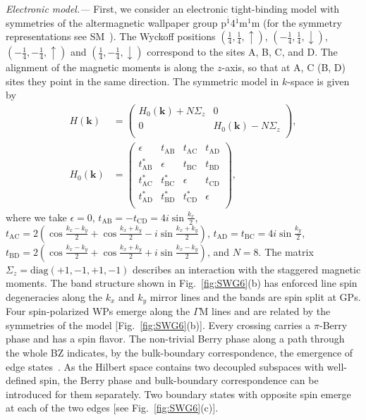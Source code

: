 \documentclass[aps,prb,twocolumn,amsmath,amssymb,floatfix]{revtex4-2}
\begin{document}
\textit{Electronic model.---}
First, we consider an electronic tight-binding model with symmetries of the altermagnetic wallpaper group p$^{\overline{1}}$4$^{\overline{1}}$m$^1$m (for the symmetry representations see SM~\cite{sm_note}). 
The Wyckoff positions $(\tfrac{1}{4},\tfrac{1}{4}, \uparrow)$, $(-\tfrac{1}{4},\tfrac{1}{4}, \downarrow)$, $(-\tfrac{1}{4},-\tfrac{1}{4}, \uparrow)$ and $(\tfrac{1}{4},-\tfrac{1}{4}, \downarrow)$ correspond to the sites A, B, C, and D. The alignment of the magnetic moments is along the $z$-axis, so that at A, C (B, D) sites they point in the same direction. The symmetric model in $k$-space is given by
\begin{subequations}\label{TBelectronicmodel_main}
\begin{align}
    H(\mathbf{k}) &= \begin{pmatrix}
        H_0(\mathbf{k}) + N \Sigma_z&0\\
        0 & H_0(\mathbf{k}) - N \Sigma_z\\
    \end{pmatrix},\\
    H_0(\mathbf{k}) &=  \begin{pmatrix}
        \epsilon&t_{\text{AB}}&t_{\text{AC}}&t_{\text{AD}}\\
        t_{\text{AB}}^* & \epsilon&t_{\text{BC}}&t_{\text{BD}}\\
        t_{\text{AC}}^* & t_{\text{BC}}^*&\epsilon&t_{\text{CD}}\\
        t_{\text{AD}}^* & t_{\text{BD}}^*&t_{\text{CD}}^*&\epsilon\\
    \end{pmatrix},
\end{align}
\end{subequations}
where we take $\epsilon =0$, $t_{\text{AB}}=-t_{\text{CD}}=4i\sin\tfrac{k_x}{2}$, $t_{\text{AC}}=2(\cos\tfrac{k_x-k_y}{2} + \cos\tfrac{k_x+k_y}{2} - i \sin\tfrac{k_x+k_y}{2})$, $t_{\text{AD}}=t_{\text{BC}}=4i \sin\tfrac{k_y}{2}$, $t_{\text{BD}}=2(\cos\tfrac{k_x-k_y}{2} + \cos\tfrac{k_x+k_y}{2} + i \sin\tfrac{k_x-k_y}{2})$, and $N = 8$. The matrix $\Sigma_z = \text{diag} (+1, -1, +1, -1)$ describes an interaction with the staggered magnetic moments.
The band structure shown in Fig.~\ref{fig:SWG6}(b) has enforced line spin degeneracies along the $k_x$ and $k_y$ mirror lines and the bands are spin split at GPs. Four spin-polarized WPs emerge along the $\Gamma$M lines and are related by the symmetries of the model [Fig.~\ref{fig:SWG6}(b)]. Every crossing carries a $\pi$-Berry phase and has a spin flavor. 
The non-trivial Berry phase along a path through the whole BZ indicates,
by the bulk-boundary correspondence, the emergence of edge states~\cite{chiu2018quantized,PhysRevB.95.035421}. As the Hilbert space contains two decoupled subspaces with well-defined spin, the Berry phase and bulk-boundary correspondence can be introduced for them separately. Two boundary states with opposite spin emerge at each of the two edges [see Fig.~\ref{fig:SWG6}(c)].
 
\end{document}
